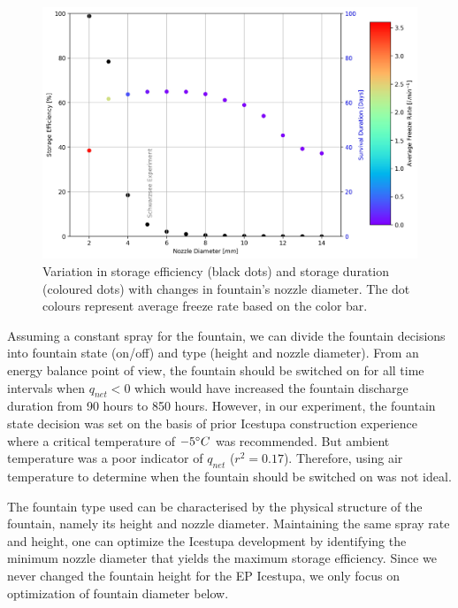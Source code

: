 \documentclass[utf8]{frontiersSCNS} %
\begin{document}
  \begin{figure} \begin{center} \includegraphics[width=15 cm]{Figures/Figure_10.jpg} \end{center} \caption{Variation
in storage efficiency (black dots) and storage duration (coloured dots) with changes in fountain's nozzle
diameter.  The dot colours represent average freeze rate based on the color bar.} \label{fig:dia_f} \end{figure}
  
Assuming a constant spray for the fountain, we can divide the fountain decisions into fountain state (on/off) and type
(height and nozzle diameter).  From an energy balance point of view, the fountain should be switched on for all time
intervals when $q_{net} < 0$ which would have increased the fountain discharge duration from 90 hours to 850 hours.
However, in our experiment, the fountain state decision was set on the basis of prior Icestupa construction
experience where a critical temperature of $-5 \degree C$ was recommended. But ambient temperature was a poor
indicator of $q_{net}$ ($r^2 = 0.17$).  Therefore, using air temperature to determine when the fountain should be
switched on was not ideal. 

The fountain type used can be characterised by the physical structure of the fountain, namely its height and nozzle
diameter. Maintaining the same spray rate and height, one can optimize the Icestupa development by identifying the
minimum nozzle diameter that yields the maximum storage efficiency. Since we never changed the fountain height for the
EP Icestupa, we only focus on optimization of fountain diameter below.
\end{document}
